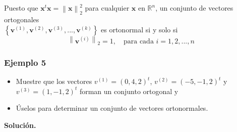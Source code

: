 \documentclass{report}
\numberwithin{subsection}{section} %
\begin{document}
Puesto que $\textbf{x}^{t}\textbf{x}=\left\| \textbf{x} \right\|_{2}^{2}$ para  cualquier $\textbf{x}$ en $\mathbb{R}^{n}$, un conjunto de vectores ortogonales \\$\left\{ \textbf{v}^{\left( 1 \right)}, \textbf{v}^{\left( 2 \right)}, \textbf{v}^{\left( 3 \right)}, ..., \textbf{v}^{\left( k \right)} \right\}$ es ortonormal si y solo si
\begin{equation*}
\left\| \textbf{v}^{\left( i \right)} \right\|_{2} = 1, \quad \text{para cada } i = 1, 2, ..., n
\end{equation*}

\subsubsection*{Ejemplo 5}

\begin{itemize}
    \item Muestre que los vectores $v^{(1)} = (0, 4, 2)^t$, $v^{(2)} = (-5,-1, 2)^t$ y $v^{(3)} = (1,-1, 2)^t$ forman un conjunto ortogonal y
    \item Úselos para determinar un conjunto de vectores ortonormales.
\end{itemize}

{\bf Solución.}
\end{document}
